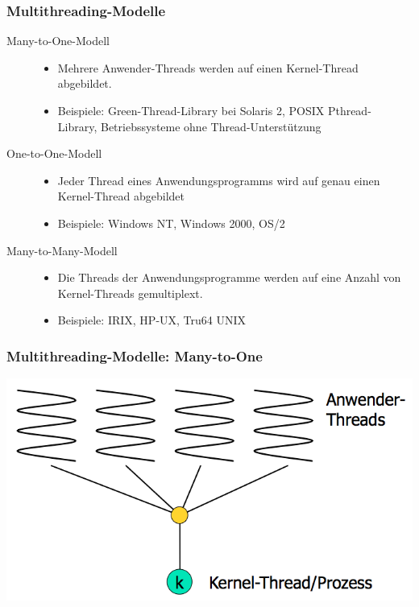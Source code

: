 \documentclass[11pt]{article}
\begin{document}
\subsubsection*{Multithreading-Modelle}
\label{sec:org84e31c5}
\begin{description}
\item[{Many-to-One-Modell}] \begin{itemize}
\item Mehrere Anwender-Threads werden auf einen Kernel-Thread abgebildet.
\item Beispiele: Green-Thread-Library bei Solaris 2, POSIX Pthread-
Library, Betriebssysteme ohne Thread-Unterstützung
\end{itemize}
\item[{One-to-One-Modell}] \begin{itemize}
\item Jeder Thread eines Anwendungsprogramms wird auf genau einen
Kernel-Thread abgebildet
\item Beispiele: Windows NT, Windows 2000, OS/2
\end{itemize}
\item[{Many-to-Many-Modell}] \begin{itemize}
\item Die Threads der Anwendungsprogramme werden auf eine Anzahl von Kernel-Threads gemultiplext.
\item Beispiele: IRIX, HP-UX, Tru64 UNIX
\end{itemize}
\end{description}
\subsubsection*{Multithreading-Modelle: Many-to-One}
\label{sec:org64f3de8}
\begin{center}
\includegraphics[width=.9\linewidth]{./Abbildungen/manytoone.png}
\end{center}
\end{document}
